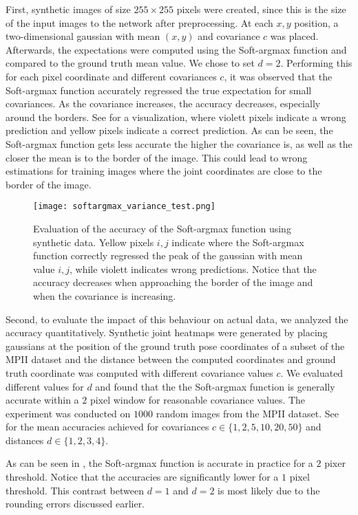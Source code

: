 First, synthetic images of size $255 \times 255$ pixels were created, since this is the size of the input images to the network after preprocessing.
At each $x,y$ position, a two-dimensional gaussian with mean $(x,y)$ and covariance $c$ was placed.
Afterwards, the expectations were computed using the Soft-argmax function and compared to the ground truth mean value.
We chose to set $d=2$.
Performing this for each pixel coordinate and different covariances $c$, it was observed that the Soft-argmax function accurately regressed the true expectation for small covariances.
As the covariance increases, the accuracy decreases, especially around the borders.
See  for a visualization, where violett pixels indicate a wrong prediction and yellow pixels indicate a correct prediction.
As can be seen, the Soft-argmax function gets less accurate the higher the covariance is, as well as the closer the mean is to the border of the image.
This could lead to wrong estimations for training images where the joint coordinates are close to the border of the image.

\begin{figure}[htb!]
    \centering
    \texttt{[image: softargmax\_variance\_test.png]}
    \caption{Evaluation of the accuracy of the Soft-argmax function using synthetic data. Yellow pixels $i,j$ indicate where the Soft-argmax function correctly regressed the peak of the gaussian with mean value $i,j$, while violett indicates wrong predictions. Notice that the accuracy decreases when approaching the border of the image and when the covariance is increasing. }
    \label{fig:softargmax_variance_test}
\end{figure}

Second, to evaluate the impact of this behaviour on actual data, we analyzed the accuracy quantitatively.
Synthetic joint heatmaps were generated by placing gaussians at the position of the ground truth pose coordinates of a subset of the MPII dataset and the distance between the computed coordinates and ground truth coordinate was computed with different covariance values $c$.
We evaluated different values for $d$ and found that the the Soft-argmax function is generally accurate within a $2$ pixel window for reasonable covariance values.
The experiment was conducted on $1000$ random images from the MPII dataset.
See  for the mean accuracies achieved for covariances $c \in \{1, 2, 5, 10, 20, 50 \}$ and distances $d \in \{1, 2, 3, 4\}$.

As can be seen in , the Soft-argmax function is accurate in practice for a $2$ pixer threshold.
Notice that the accuracies are significantly lower for a $1$ pixel threshold.
This contrast between $d=1$ and $d=2$ is most likely due to the rounding errors discussed earlier.

